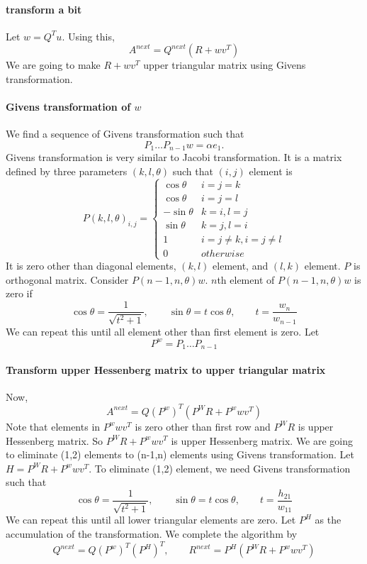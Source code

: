 \documentclass[12pt]{article}
\begin{document}
\paragraph{transform a bit}
Let $w=Q^Tu$. Using this, 
\[
A^{next} = Q^{next}(R+wv^T)
\]
We are going to make $R+wv^T$ upper triangular matrix using Givens transformation.

\paragraph{Givens transformation of $w$}
We find a sequence of Givens transformation such that 
\[
P_1\dots P_{n-1}w = \alpha e_1.
\]
Givens transformation is very similar to Jacobi transformation. It is a matrix defined by three
parameters $(k,l,\theta)$ such that $(i,j)$
element is 
\[
P(k,l,\theta)_{i,j} = \begin{cases}
\cos \theta & i=j=k \\
\cos \theta & i=j = l\\
-\sin \theta & k = i , l = j \\
\sin \theta & k = j, l=i \\
1 & i = j \neq k, i = j \neq l\\
0 & otherwise
\end{cases}
\]
It is zero other than diagonal elements, $(k,l)$ element, and $(l,k)$ element. $P$ is orthogonal
matrix.  Consider
$P(n-1,n,\theta) w$.  $n$th element of $P(n-1,n,\theta) w$ is zero if
\[
\cos \theta = \frac{1}{\sqrt{t^2+1}}, \qquad
\sin \theta = t \cos \theta, \qquad t = \frac{w_n}{w_{n-1}}
\]
We can repeat this until all element other than first element is zero. 
Let 
\[
P^w = P_1\dots P_{n-1}
\]

\paragraph{Transform upper Hessenberg matrix to upper triangular matrix}
Now,
\[
A^{next} = Q (P^w)^T(P^WR+P^wwv^T)
\]
Note that elements in $P^wwv^T$ is zero other than first row and $P^WR$ is upper Hessenberg
matrix. So $P^WR+P^wwv^T$ is upper Hessenberg matrix. We are going to eliminate (1,2) elements to
(n-1,n) elements using Givens transformation.  Let $H =P^WR+P^wwv^T$. To eliminate (1,2) element,
we need Givens transformation such that
\[
\cos \theta = \frac{1}{\sqrt{t^2+1}}, \qquad
\sin \theta = t \cos \theta, \qquad t = \frac{h_{21}}{w_{11}}
\]
We can repeat this until all lower triangular elements are zero. Let $P^H$ as the accumulation of
the transformation. We complete the algorithm by 
\[
Q^{next} =  Q (P^w)^T(P^H)^T, \qquad R^{next} = P^H(P^WR+P^wwv^T)
\]
\end{document}
